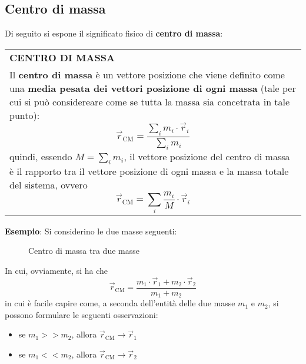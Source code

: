 \documentclass[a4paper]{extarticle}
\renewcommand\arraystretch{}
\begin{document}
\vspace{1em}
\subsection{Centro di massa}
Di seguito si espone il significato fisico di \textbf{centro di massa}:

\vspace{1em}
\setlength{\tabcolsep}{14pt}
\renewcommand{\arraystretch}{2}
\noindent
\begin{tabularx}{\textwidth}{@{}|P|@{}}
    \hline
    {\textbf{CENTRO DI MASSA}}\\
    \parbox{\linewidth}{Il \textbf{centro di massa} è un vettore posizione che viene definito come una \textbf{media pesata dei vettori posizione di ogni massa} (tale per cui si può considereare come se tutta la massa sia concetrata in tale punto):
    \[\boxed{\vec r_{\text{CM}} = \frac{\displaystyle{\sum_i m_i \cdot \vec r_i}}{\displaystyle{\sum_i m_i}}}\]
    quindi, essendo $M=\displaystyle{\sum_i m_i}$, il vettore posizione del centro di massa è il rapporto tra il vettore posizione di ogni massa e la massa totale del sistema, ovvero
    \[\boxed{\vec r_{\text{CM}} = \sum_i \frac{m_i}{M} \cdot \vec r_i}\]
    \vspace{-1mm}}\\
    \hline
\end{tabularx}

\vspace{1em}
\noindent
\textbf{Esempio}: Si considerino le due masse seguenti:

\vspace{1em}
\begin{figure}[H]
  \centering
  \caption{Centro di massa tra due masse}
  \label{fig:centro_di_massa}
\end{figure}

\vspace{1em}
\noindent
In cui, ovviamente, si ha che
\[\vec r_{\text{CM}} = \frac{m_1 \cdot \vec r_1 + m_2 \cdot \vec r_2}{m_1 + m_2}\]
in cui è facile capire come, a seconda dell'entità delle due masse $m_1$ e $m_2$, si possono formulare le seguenti osservazioni:
\begin{itemize}
  \item se $m_1 >> m_2$, allora $\vec r_{\text{CM}} \to \vec r_1$
  \item se $m_1 << m_2$, allora $\vec r_{\text{CM}} \to \vec r_2$
\end{itemize}
\end{document}
